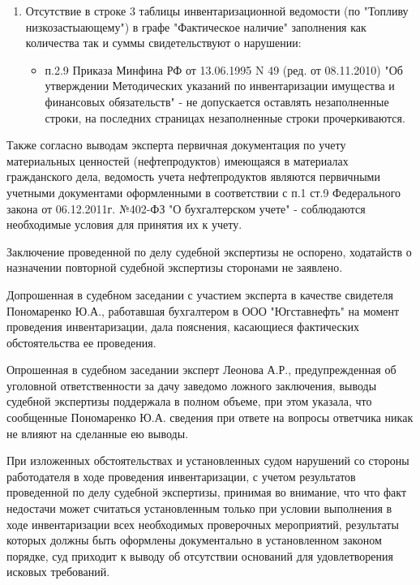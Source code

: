 \documentclass[a4paper]{article}
\begin{document}
\begin{enumerate}
			\item Отсутствие в строке 3 таблицы инвентаризационной ведомости (по "Топливу низкозастыающему") в графе "Фактическое наличие" заполнения как количества так и суммы свидетельствуют о нарушении: \begin{itemize}
				\item п.2.9 Приказа Минфина РФ от 13.06.1995 N 49 (ред. от 08.11.2010) "Об утверждении Методических указаний по инвентаризации имущества и финансовых обязательств" - не допускается оставлять незаполненные строки, на последних страницах незаполненные строки прочеркиваются.
			\end{itemize}
		\end{enumerate}
		
		Также согласно выводам эксперта первичная документация по учету материальных ценностей (нефтепродуктов) имеющаяся в материалах гражданского дела, ведомость учета нефтепродуктов являются первичными учетными документами оформленными в соответствии с п.1 ст.9 Федерального закона от 06.12.2011г. №402-ФЗ "О бухгалтерском учете" - соблюдаются необходимые условия для принятия их к учету.
		
		Заключение проведенной по делу судебной экспертизы не оспорено, ходатайств о назначении повторной судебной экспертизы сторонами не заявлено.
		
		Допрошенная в судебном заседании с участием эксперта в качестве свидетеля Пономаренко Ю.А., работавшая бухгалтером в ООО "Югставнефть" на момент проведения инвентаризации, дала пояснения, касающиеся фактических обстоятельства ее проведения.
			
		Опрошенная в судебном заседании эксперт Леонова А.Р., предупрежденная об уголовной ответственности за дачу заведомо ложного заключения, выводы судебной экспертизы поддержала в полном объеме, при этом указала, что сообщенные Пономаренко Ю.А. сведения при ответе на вопросы ответчика никак не влияют на сделанные ею выводы.
			
		При изложенных обстоятельствах и установленных судом нарушений со стороны работодателя в ходе проведения инвентаризации, с учетом результатов проведенной по делу судебной экспертизы, принимая во внимание, что что факт недостачи может считаться установленным только при условии выполнения в ходе инвентаризации всех необходимых проверочных мероприятий, результаты которых должны быть оформлены документально в установленном законом порядке, суд приходит к выводу об отсутствии оснований для удовлетворения исковых требований.
			
\end{document}

